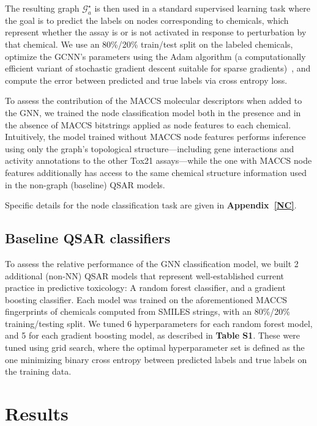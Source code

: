 \documentclass{ws-procs11x85}
\begin{document}
\begin{algorithmic}
   
\end{algorithmic}
The resulting graph $\mathcal{G}_a^\star$ is then used in a standard supervised learning task where the goal is to predict the labels on nodes corresponding to chemicals, which represent whether the assay is or is not activated in response to perturbation by that chemical.
We use an 80\%/20\% train/test split on the labeled chemicals, optimize the GCNN's parameters using the Adam algorithm (a computationally efficient variant of stochastic gradient descent suitable for sparse gradients)~\cite{kingma2014adam}, and compute the error between predicted and true labels via cross entropy loss.

To assess the contribution of the MACCS molecular descriptors when added to the GNN, we trained the node classification model both in the presence and in the absence of MACCS bitstrings applied as node features to each chemical.
Intuitively, the model trained without MACCS node features performs inference using only the graph's topological structure---including gene interactions and activity annotations to the other Tox21 assays---while the one with MACCS node features additionally has access to the same chemical structure information used in the non-graph (baseline) QSAR models.

Specific details for the node classification task are given in \textbf{Appendix~\ref{NC}}.

\subsection{Baseline QSAR classifiers}
To assess the relative performance of the GNN classification model, we built 2 additional (non-NN) QSAR models that represent well-established current practice in predictive toxicology: A random forest classifier, and a gradient boosting classifier.
Each model was trained on the aforementioned MACCS fingerprints of chemicals computed from SMILES strings, with an 80\%/20\% training/testing split.
We tuned 6 hyperparameters for each random forest model, and 5 for each gradient boosting model, as described in \textbf{Table S1}.
These were tuned using grid search, where the optimal hyperparameter set is defined as the one minimizing binary cross entropy between predicted labels and true labels on the training data.

\section{Results}
\end{document}

